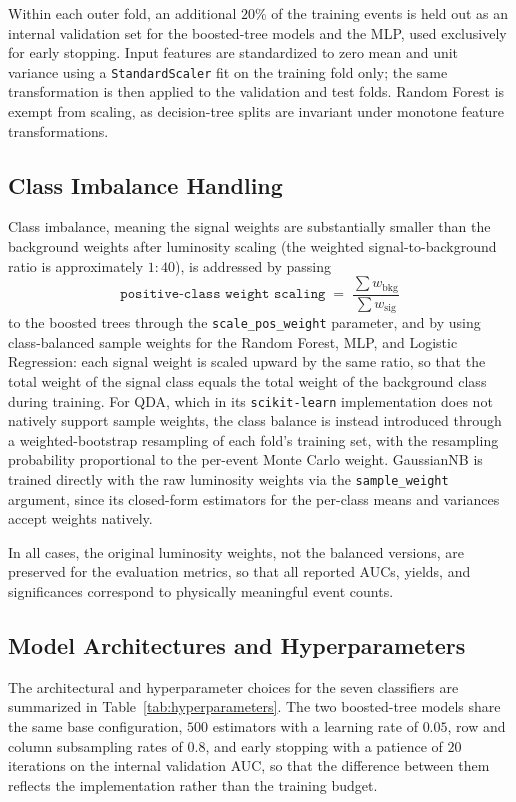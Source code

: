 \documentclass[conference]{IEEEtran}
\begin{document}
{Within each outer fold, an additional $20\%$ of the training
events is held out as an internal validation set for the
boosted-tree models and the MLP, used exclusively for early
stopping. Input features are standardized to zero mean and unit
variance using a \texttt{StandardScaler} fit on the training
fold only; the same transformation is then applied to the
validation and test folds. Random Forest is exempt from
scaling, as decision-tree splits are invariant under monotone
feature transformations.
 
\subsection{Class Imbalance Handling}
 
Class imbalance, meaning the signal weights are substantially
smaller than the background weights after luminosity scaling
(the weighted signal-to-background ratio is approximately
$1:40$), is addressed by passing
\[
\texttt{positive-class weight scaling} \;=\;
\frac{\sum w_{\mathrm{bkg}}}{\sum w_{\mathrm{sig}}}
\]
to the boosted trees through the \texttt{scale\_pos\_weight}
parameter, and by using class-balanced sample weights for the
Random Forest, MLP, and Logistic Regression: each signal weight
is scaled upward by the same ratio, so that the total weight
of the signal class equals the total weight of the background
class during training. For QDA, which in its \texttt{scikit-learn}
implementation does not natively support sample weights, the
class balance is instead introduced through a weighted-bootstrap
resampling of each fold's training set, with the resampling
probability proportional to the per-event Monte Carlo weight.
GaussianNB is trained directly with the raw luminosity weights
via the \texttt{sample\_weight} argument, since its closed-form
estimators for the per-class means and variances accept weights
natively.
 
In all cases, the original luminosity weights, not the balanced
versions, are preserved for the evaluation metrics, so that all
reported AUCs, yields, and significances correspond to physically
meaningful event counts.
 
\subsection{Model Architectures and Hyperparameters}
 
The architectural and hyperparameter choices for the seven
classifiers are summarized in Table~\ref{tab:hyperparameters}.
The two boosted-tree models share the same base configuration,
$500$ estimators with a learning rate of $0.05$, row and column
subsampling rates of $0.8$, and early stopping with a patience
of $20$ iterations on the internal validation AUC, so that the
difference between them reflects the implementation rather than
the training budget.
 
}
\end{document}
